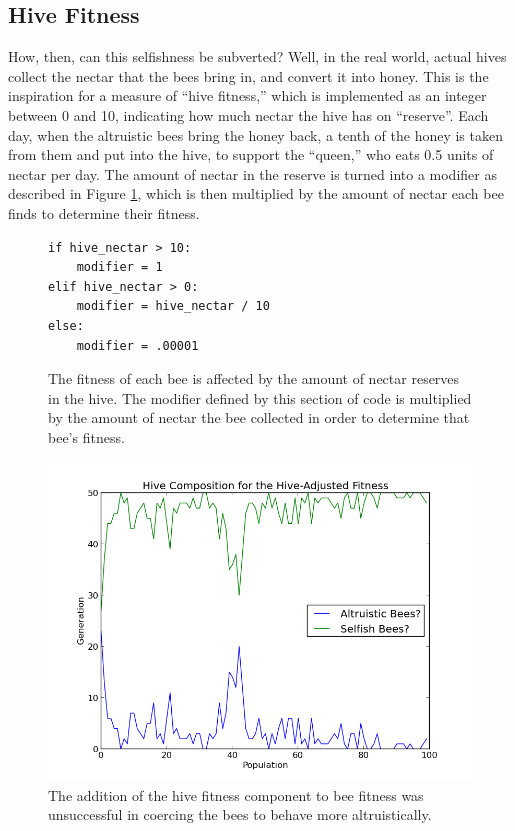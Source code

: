 \documentclass[twoside]{article}
\begin{document}
\begin{multicols}{2}
		\subsection{Hive Fitness} %
		\label{sub:hive_fitness}
				How, then, can this selfishness be subverted? Well, in the real world, actual hives collect the	 nectar that the bees bring in, and convert it into honey. This is the inspiration for a measure of ``hive fitness,'' which is implemented as an integer between 0 and 10, indicating how much nectar the hive has on ``reserve''. Each day, when the altruistic bees bring the honey back, a tenth of the honey is taken from them and put into the hive, to support the ``queen,'' who eats 0.5 units of nectar per day. The amount of nectar in the reserve is turned into a modifier as described in Figure \ref{fig:modifier_algorithm}, which is then multiplied by the amount of nectar each bee finds to determine their fitness.

			\begin{figure}[H]
				\begin{Verbatim}[frame=single]
if hive_nectar > 10:
    modifier = 1
elif hive_nectar > 0:
    modifier = hive_nectar / 10
else:
    modifier = .00001 
				\end{Verbatim}
				\caption{The fitness of each bee is affected by the amount of nectar reserves in the hive. The modifier defined by this section of code is multiplied by the amount of nectar the bee collected in order to determine that bee's fitness.}
				\label{fig:modifier_algorithm}
			\end{figure}

			\begin{figure}[H]
				\begin{center}
					\includegraphics[width=.5\textwidth]{results/hive_fitness_comp.png}
				\end{center}
				\caption{The addition of the hive fitness component to bee fitness was unsuccessful in coercing the bees to behave more altruistically.}
				\label{fig:hive_fitness_composition}
			\end{figure}


\end{multicols}
\end{document}
